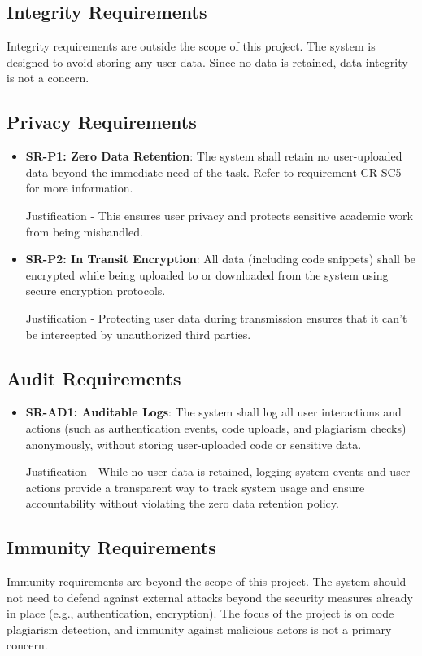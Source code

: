 \documentclass[12pt]{article}
\begin{document}
\subsection{Integrity Requirements}
Integrity requirements are outside the scope of this project. The system is designed to avoid storing any user data.
Since no data is retained, data integrity is not a concern.

\subsection{Privacy Requirements}
\begin{itemize}
    \item \textbf{SR-P1: Zero Data Retention}: The system shall retain no user-uploaded data beyond the immediate need of the task.
    Refer to requirement CR-SC5 for more information.

    Justification - This ensures user privacy and protects sensitive academic work from being mishandled.

    \item \textbf{SR-P2: In Transit Encryption}: All data (including code snippets) shall be encrypted while being uploaded to or downloaded
    from the system using secure encryption protocols.

    Justification - Protecting user data during transmission ensures that it can't be intercepted by unauthorized third parties.
\end{itemize}

\subsection{Audit Requirements}
\begin{itemize}
    \item \textbf{SR-AD1: Auditable Logs}: The system shall log all user interactions and actions (such as authentication events, code uploads, and plagiarism checks) anonymously, without storing user-uploaded code or sensitive data.

    Justification - While no user data is retained, logging system events and user actions provide a transparent way to track system usage and ensure accountability without violating the zero data retention policy.
\end{itemize}

\subsection{Immunity Requirements}
Immunity requirements are beyond the scope of this project. The system should not need to defend against external attacks
beyond the security measures already in place (e.g., authentication, encryption).
The focus of the project is on code plagiarism detection, and immunity against malicious actors is not a primary concern.
\end{document}
